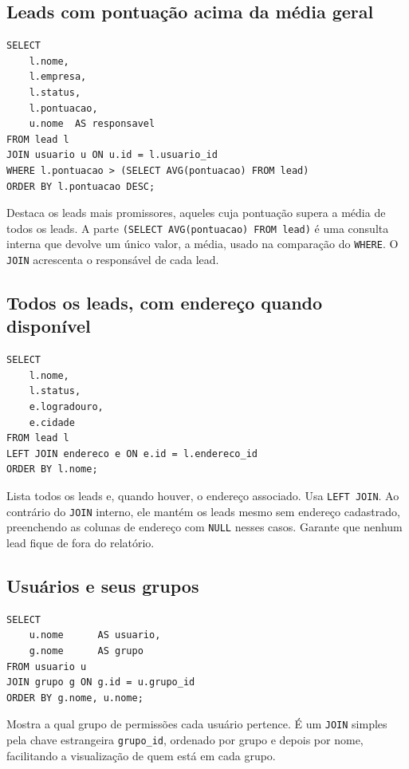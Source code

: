 \documentclass[a4paper]{article}
\begin{document}
\subsection{Leads com pontuação acima da média geral}

\begin{verbatim}
SELECT
    l.nome,
    l.empresa,
    l.status,
    l.pontuacao,
    u.nome  AS responsavel
FROM lead l
JOIN usuario u ON u.id = l.usuario_id
WHERE l.pontuacao > (SELECT AVG(pontuacao) FROM lead)
ORDER BY l.pontuacao DESC;
\end{verbatim}

Destaca os leads mais promissores, aqueles cuja pontuação supera a média de todos os
leads. A parte \texttt{(SELECT AVG(pontuacao) FROM lead)} é uma consulta interna que
devolve um único valor, a média, usado na comparação do \texttt{WHERE}. O \texttt{JOIN}
acrescenta o responsável de cada lead.

\subsection{Todos os leads, com endereço quando disponível}

\begin{verbatim}
SELECT
    l.nome,
    l.status,
    e.logradouro,
    e.cidade
FROM lead l
LEFT JOIN endereco e ON e.id = l.endereco_id
ORDER BY l.nome;
\end{verbatim}

Lista todos os leads e, quando houver, o endereço associado. Usa \texttt{LEFT JOIN}. Ao
contrário do \texttt{JOIN} interno, ele mantém os leads mesmo sem endereço cadastrado,
preenchendo as colunas de endereço com \texttt{NULL} nesses casos. Garante que nenhum lead
fique de fora do relatório.

\subsection{Usuários e seus grupos}

\begin{verbatim}
SELECT
    u.nome      AS usuario,
    g.nome      AS grupo
FROM usuario u
JOIN grupo g ON g.id = u.grupo_id
ORDER BY g.nome, u.nome;
\end{verbatim}

Mostra a qual grupo de permissões cada usuário pertence. É um \texttt{JOIN} simples pela
chave estrangeira \texttt{grupo\_id}, ordenado por grupo e depois por nome, facilitando a
visualização de quem está em cada grupo.
\end{document}
